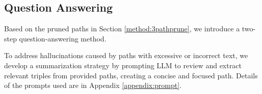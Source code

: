 \vspace{-1pt}
\subsection{Question Answering}
Based on the pruned paths in Section \ref{method:3pathprune}, we introduce a two-step question-answering method.


To address hallucinations caused by paths with excessive or incorrect text, we develop a summarization strategy by prompting LLM to review and extract relevant triples from provided paths, creating a concise and focused path. Details of the prompts used are in Appendix \ref{appendix:prompt}.

